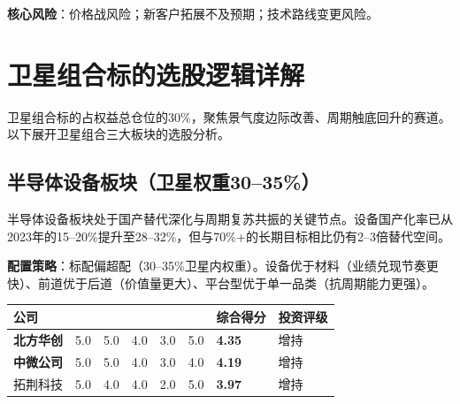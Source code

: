 \textbf{核心风险}：价格战风险；新客户拓展不及预期；技术路线变更风险。

\section{卫星组合标的选股逻辑详解}

卫星组合标的占权益总仓位的30\%，聚焦景气度边际改善、周期触底回升的赛道。以下展开卫星组合三大板块的选股分析。

\subsection{半导体设备板块（卫星权重30--35\%）}

半导体设备板块处于国产替代深化与周期复苏共振的关键节点。设备国产化率已从2023年的15--20\%提升至28--32\%，但与70\%+的长期目标相比仍有2--3倍替代空间。

\textbf{配置策略}：标配偏超配（30--35\%卫星内权重）。设备优于材料（业绩兑现节奏更快）、前道优于后道（价值量更大）、平台型优于单一品类（抗周期能力更强）。

\begin{exhibitbox}
\centering
\scriptsize
\setlength{\tabcolsep}{2pt}

\begin{tabularx}{\linewidth}{X C{1.4cm} C{1.4cm} C{1.4cm} C{1.4cm} C{1.4cm} C{1.4cm} C{1.6cm}}
\toprule
\textbf{公司} & \textbf{} & \textbf{} & \textbf{} & \textbf{} & \textbf{} & \textbf{综合得分} & \textbf{投资评级} \\
\midrule
{}
\textbf{北方华创} & 5.0 & 5.0 & 4.0 & 3.0 & 5.0 & \textbf{4.35} & 增持 \\
\textbf{中微公司} & 5.0 & 5.0 & 4.0 & 3.0 & 4.0 & \textbf{4.19} & 增持 \\
拓荆科技 & 5.0 & 4.0 & 4.0 & 2.0 & 5.0 & \textbf{3.97} & 增持 \\
\hline
\bottomrule
\end{tabularx}
\end{exhibitbox}


